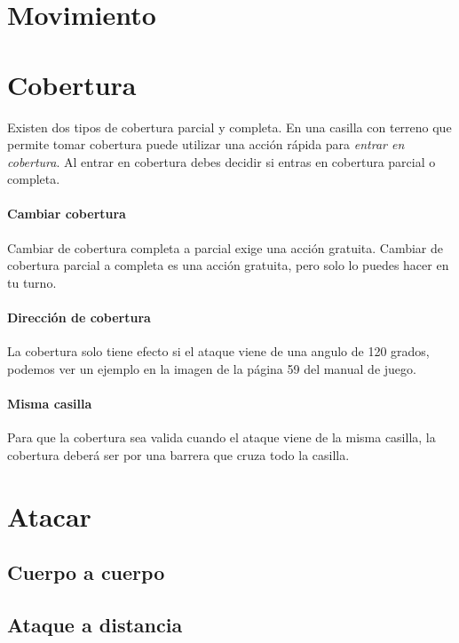 \section{Movimiento}


\section{Cobertura}
    Existen dos tipos de cobertura parcial y completa. En una casilla con terreno que permite tomar cobertura puede utilizar una acción rápida para \emph{entrar en cobertura}.
    Al entrar en cobertura debes decidir si entras en cobertura parcial o completa.

    \paragraph{Cambiar cobertura}
    Cambiar de cobertura completa a parcial exige una acción gratuita. Cambiar de cobertura parcial a completa es una acción gratuita, pero solo lo puedes hacer en tu turno.

    \paragraph{Dirección de cobertura}
    La cobertura solo tiene efecto si el ataque viene de una angulo de 120 grados, podemos ver un ejemplo en la imagen de la página 59 del manual de juego.

    \paragraph{Misma casilla}
    Para que la cobertura sea valida cuando el ataque viene de la misma casilla, la cobertura deberá ser por una barrera que cruza todo la casilla.

\section{Atacar}

    \subsection{Cuerpo a cuerpo} \label{page:retreat}

    \subsection{Ataque a distancia}

